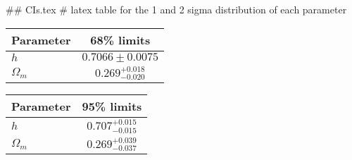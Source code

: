## CIs.tex
# latex table for the 1 and 2 sigma distribution of each parameter

\begin{tabular} { l  c}
 Parameter &  68\% limits\\
\hline
{\boldmath$h              $} & $0.7066\pm 0.0075          $\\
{\boldmath$\Omega_m       $} & $0.269^{+0.018}_{-0.020}   $\\
\hline
\end{tabular}

\begin{tabular} { l  c}
 Parameter &  95\% limits\\
\hline
{\boldmath$h              $} & $0.707^{+0.015}_{-0.015}   $\\
{\boldmath$\Omega_m       $} & $0.269^{+0.039}_{-0.037}   $\\
\hline
\end{tabular}
